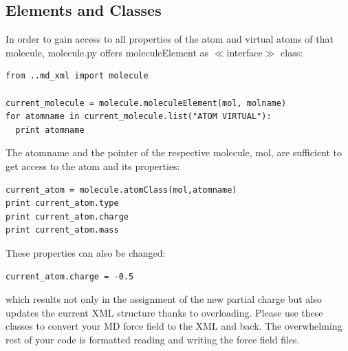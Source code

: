 \documentclass[12pt]{article}
\begin{document}
\subsection{Elements and Classes}
In order to gain access to all properties of the atom and virtual atoms of that molecule, molecule.py offers moleculeElement as $\ll$interface$\gg$ class:
\begin{lstlisting}[basicstyle=\linespread{1}\ttfamily\small]
from ..md_xml import molecule

current_molecule = molecule.moleculeElement(mol, molname)
for atomname in current_molecule.list("ATOM VIRTUAL"):
  print atomname
\end{lstlisting}
The atomname and the pointer of the respective molecule, mol, are sufficient to get access to the atom and its properties:
\begin{lstlisting}[basicstyle=\linespread{1}\ttfamily\small]
current_atom = molecule.atomClass(mol,atomname)
print current_atom.type
print current_atom.charge
print current_atom.mass
\end{lstlisting}
These properties can also be changed:
\begin{lstlisting}[basicstyle=\linespread{1}\ttfamily\small]
current_atom.charge = -0.5
\end{lstlisting}
which results not only in the assignment of the new partial charge but also updates the current XML structure thanks to overloading. Please use 
these classes to convert your MD force field to the XML and back. The overwhelming rest of your code is formatted reading and writing the force 
field files.
\end{document}
